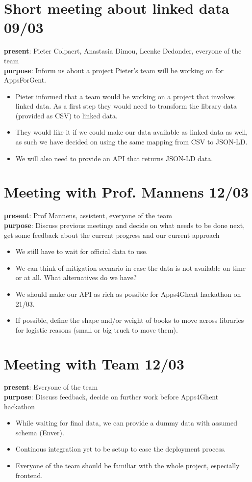 \section{Short meeting about linked data 09/03}
{\bf present}: Pieter Colpaert, Anastasia Dimou, Leenke Dedonder, everyone of the team\\
{\bf purpose}: Inform us about a project Pieter's team will be working on for AppsForGent.
\begin{itemize}
  \item Pieter informed that a team would be working on a project that involves linked data. As a first step they would need to transform the library data (provided as CSV) to linked data.
  \item They would like it if we could make our data available as linked data as well, as such we have decided on using the same mapping from CSV to JSON-LD.
  \item We will also need to provide an API that returns JSON-LD data.
\end{itemize}

\section{Meeting with Prof. Mannens 12/03}
{\bf present}: Prof Mannens, assistent, everyone of the team\\
{\bf purpose}: Discuss previous meetings and decide on what needs to be done next, get some feedback about the current progress and our current approach\\
\begin{itemize}
	\item We still have to wait for official data to use.
	\item We can think of mitigation scenario in case the data is not available on time or at all. What alternatives do we have?
	\item We should make our API as rich as possible for Apps4Ghent hackathon on 21/03.
	\item If possible, define the shape and/or weight of books to move across libraries for logistic reasons (small or big truck to move them).
\end{itemize}

\section{Meeting with Team 12/03}
{\bf present}: Everyone of the team\\
{\bf purpose}: Discuss feedback, decide on further work before Apps4Ghent hackathon\\
\begin{itemize}
	\item While waiting for final data, we can provide a dummy data with assumed schema (Enver). 
	\item Continous integration yet to be setup to ease the deployment process.
	\item Everyone of the team should be familiar with the whole project, especially frontend.
\end{itemize}